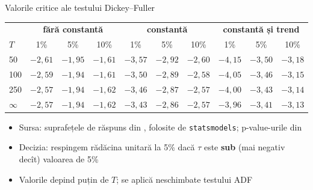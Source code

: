 \begin{frame}{Valorile critice ale testului Dickey--Fuller}
\itemsize{\small}
\begin{center}
\scriptsize
\begin{tabular}{lccc|ccc|ccc}
\toprule
& \multicolumn{3}{c|}{\textbf{fără constantă}} & \multicolumn{3}{c|}{\textbf{constantă}} & \multicolumn{3}{c}{\textbf{constantă și trend}} \\ $T$ & 1\% & 5\% & 10\% & 1\% & 5\% & 10\% & 1\% & 5\% & 10\% \\
\midrule
50 & $\ensuremath{-}2{,}61$ & $\ensuremath{-}1{,}95$ & $\ensuremath{-}1{,}61$ & $\ensuremath{-}3{,}57$ & $\ensuremath{-}2{,}92$ & $\ensuremath{-}2{,}60$ & $\ensuremath{-}4{,}15$ & $\ensuremath{-}3{,}50$ & $\ensuremath{-}3{,}18$ \\
100 & $\ensuremath{-}2{,}59$ & $\ensuremath{-}1{,}94$ & $\ensuremath{-}1{,}61$ & $\ensuremath{-}3{,}50$ & $\ensuremath{-}2{,}89$ & $\ensuremath{-}2{,}58$ & $\ensuremath{-}4{,}05$ & $\ensuremath{-}3{,}46$ & $\ensuremath{-}3{,}15$ \\
250 & $\ensuremath{-}2{,}57$ & $\ensuremath{-}1{,}94$ & $\ensuremath{-}1{,}62$ & $\ensuremath{-}3{,}46$ & $\ensuremath{-}2{,}87$ & $\ensuremath{-}2{,}57$ & $\ensuremath{-}4{,}00$ & $\ensuremath{-}3{,}43$ & $\ensuremath{-}3{,}14$ \\
$\infty$ & $\ensuremath{-}2{,}57$ & $\ensuremath{-}1{,}94$ & $\ensuremath{-}1{,}62$ & $\ensuremath{-}3{,}43$ & $\ensuremath{-}2{,}86$ & $\ensuremath{-}2{,}57$ & $\ensuremath{-}3{,}96$ & $\ensuremath{-}3{,}41$ & $\ensuremath{-}3{,}13$ \\
\bottomrule
\end{tabular}
\end{center}
\begin{itemize}
    \item Sursa: suprafețele de răspuns din , folosite de \texttt{statsmodels}; p-value-urile din 
    \item Decizia: respingem rădăcina unitară la 5\% dacă $\tau$ este \textbf{sub} (mai negativ decît) valoarea de 5\%
    \item Valorile depind puțin de $T$; se aplică neschimbate testului ADF
\end{itemize}
\end{frame}

